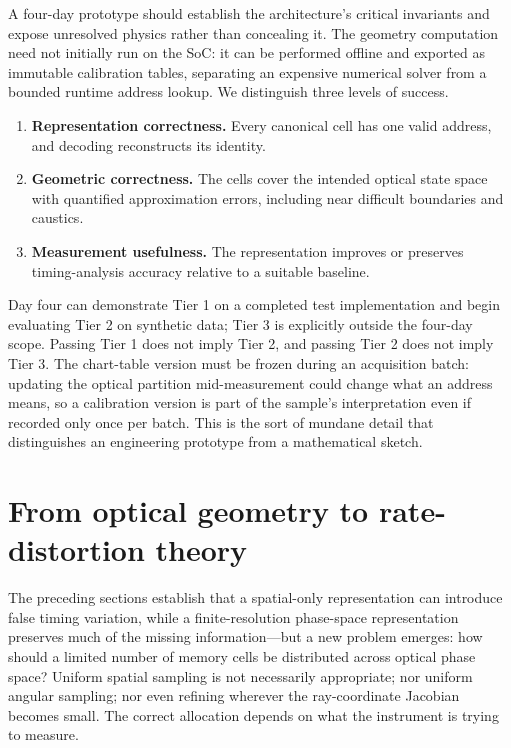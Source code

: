 \documentclass[11pt]{article}
\begin{document}
A four-day prototype should establish the architecture's critical invariants and expose
unresolved physics rather than concealing it. The geometry computation need not
initially run on the SoC: it can be performed offline and exported as immutable
calibration tables, separating an expensive numerical solver from a bounded runtime
address lookup. We distinguish three levels of success.

\begin{enumerate}[label=\textbf{Tier \arabic*:}]
\item \textbf{Representation correctness.} Every canonical cell has one valid address,
and decoding reconstructs its identity.
\item \textbf{Geometric correctness.} The cells cover the intended optical state space
with quantified approximation errors, including near difficult boundaries and caustics.
\item \textbf{Measurement usefulness.} The representation improves or preserves
timing-analysis accuracy relative to a suitable baseline.
\end{enumerate}

Day four can demonstrate Tier 1 on a completed test implementation and begin evaluating
Tier 2 on synthetic data; Tier 3 is explicitly outside the four-day scope. Passing Tier
1 does not imply Tier 2, and passing Tier 2 does not imply Tier 3. The chart-table
version must be frozen during an acquisition batch: updating the optical partition
mid-measurement could change what an address means, so a calibration version is part of
the sample's interpretation even if recorded only once per batch. This is the sort of
mundane detail that distinguishes an engineering prototype from a mathematical sketch.

\section{From optical geometry to rate-distortion theory}\label{sec:rate-distortion}

The preceding sections establish that a spatial-only representation can introduce false
timing variation, while a finite-resolution phase-space representation preserves much of
the missing information---but a new problem emerges: how should a limited number of
memory cells be distributed across optical phase space? Uniform spatial sampling is not
necessarily appropriate; nor uniform angular sampling; nor even refining wherever the
ray-coordinate Jacobian becomes small. The correct allocation depends on what the
instrument is trying to measure.
\end{document}
